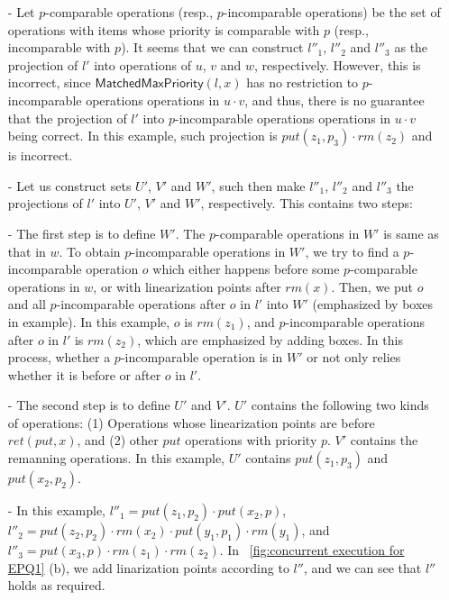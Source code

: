 \begin{itemize}
\setlength{\itemsep}{0.5pt}
\item[-] Let $p$-comparable operations (resp., $p$-incomparable operations) be the set of operations with items whose priority is comparable with $p$ (resp., incomparable with $p$). It seems that we can construct $l''_1$, $l''_2$ and $l''_3$ as the projection of $l'$ into operations of $u$, $v$ and $w$, respectively. However, this is incorrect, since $\mathsf{MatchedMaxPriority}(l,x)$ has no restriction to $p$-incomparable operations operations in $u \cdot v$, and thus, there is no guarantee that the projection of $l'$ into $p$-incomparable operations operations in $u \cdot v$ being correct. In this example, such projection is $\textit{put}(z_1,p_3) \cdot \textit{rm}(z_2)$ and is incorrect.

\item[-] Let us construct sets $U'$, $V'$ and $W'$, such then make $l''_1$, $l''_2$ and $l''_3$ the projections of $l'$ into $U'$, $V'$ and $W'$, respectively. This contains two steps:

\item[-] The first step is to define $W'$. The $p$-comparable operations in $W'$ is same as that in $w$. To obtain $p$-incomparable operations in $W'$, we try to find a $p$-incomparable operation $o$ which either happens before some $p$-comparable operations in $w$, or with linearization points after $\textit{rm}(x)$. Then, we put $o$ and all $p$-incomparable operations after $o$ in $l'$ into $W'$ (emphasized by boxes in example). In this example, $o$ is $\textit{rm}(z_1)$, and $p$-incomparable operations after $o$ in $l'$ is $\textit{rm}(z_2)$, which are emphasized by adding boxes. In this process, whether a $p$-incomparable operation is in $W'$ or not only relies whether it is before or after $o$ in $l'$.

\item[-] The second step is to define $U'$ and $V'$. $U'$ contains the following two kinds of operations: (1) Operations whose linearization points are before $\textit{ret}(\textit{put},x)$, and (2) other $\textit{put}$ operations with priority $p$. $V'$ contains the remanning operations. In this example, $U'$ contains $\textit{put}(z_1,p_3)$ and $\textit{put}(x_2,p_2)$.

\item[-] In this example, $l''_1 = \textit{put}(z_1,p_2) \cdot \textit{put}(x_2,p)$, $l''_2 = \textit{put}(z_2,p_2) \cdot \textit{rm}(x_2) \cdot \textit{put}(y_1,p_1) \cdot \textit{rm}(y_1)$, and $l''_3 = \textit{put}(x_3,p) \cdot \textit{rm}(z_1) \cdot \textit{rm}(z_2)$. In \figurename~\ref{fig:concurrent execution for EPQ1} (b), we add linarization points according to $l''$, and we can see that $l''$ holds as required.
\end{itemize}


